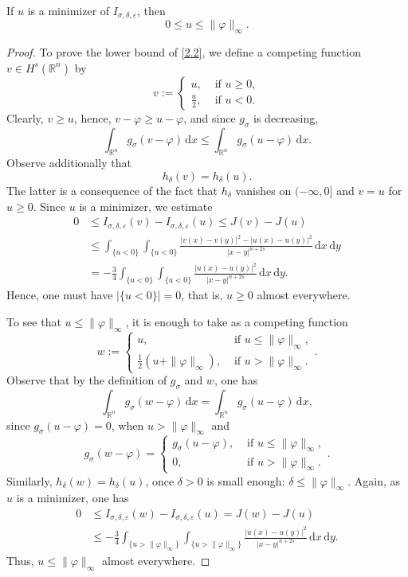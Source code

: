 \documentclass[10pt,a4paper]{amsart}
\newcommand{\R}{\mathbb{R}}
\begin{document}
\begin{proposition}\label{p2.1}
If $u$ is a minimizer of $I_{\sigma,\delta,\varepsilon}$, then 
\begin{equation}\label{2.2}
0\le u \le \| \varphi\|_\infty.
\end{equation}
\end{proposition} 

\begin{proof}	
	To prove the lower bound of \eqref{2.2}, we define a competing function $v\in H^s(\R^n)$ by
	\begin{equation*}
	v:= \begin{cases}
	u, & \text{ if }u\ge0,\\
	\frac{u}{2}, & \text{ if } u<0.
	\end{cases}
	\end{equation*}
	Clearly, $v\ge u$, hence, $v-\varphi\ge u-\varphi$, and since $g_{\sigma}$ is decreasing,
	$$
	\int_{\R^n} g_\sigma(v-\varphi)\,\mathrm{d}x\le\int_{\R^n}  g_\sigma(u-\varphi)\,\mathrm{d}x.
	$$
	Observe additionally that  
	$$
	h_\delta(v)=h_\delta(u).
	$$ 
	The latter is a consequence of the fact that $h_\delta$ vanishes on $(-\infty,0]$ and $v=u$ for $u\ge0$. Since $u$ is a minimizer, we estimate
	\begin{align*}
	0 &\le I_{\sigma,\delta,\varepsilon}(v)-I_{\sigma,\delta,\varepsilon}(u)\leq J(v)-J(u)\\
	&\le\int_{\{u<0\}}\int_{\{u<0\}}\frac{|v(x)-v(y)|^2-|u(x)-u(y)|^2}{|x-y|^{n+2s}}\,\mathrm{d}x\,\mathrm{d}y\\
	&=-\frac{3}{4}\int_{\{u<0\}}\int_{\{u<0\}}\frac{|u(x)-u(y)|^2}{|x-y|^{n+2s}}\,\mathrm{d}x\,\mathrm{d}y.
	\end{align*}
	Hence, one must have $|\{u<0\}|=0$, that is, $u\ge0$ almost everywhere.	
	
	To see that $u\le\|\varphi\|_\infty$, it is enough to take as a competing function 
	\[
	w:=\begin{cases}
	u, &  \text{ if } u\le\|\varphi\|_\infty,\\ 
	\frac12\left(u+\|\varphi\|_\infty\right), & \text{ if }u>\|\varphi\|_\infty.
	\end{cases}.
	\] 
	Observe that by the definition of $g_\sigma$ and $w$, one has
	$$
	\int_{\R^n} g_\sigma(w-\varphi)\,\mathrm{d}x=\int_{\R^n} g_\sigma(u-\varphi)\,\mathrm{d}x,
	$$
	since $g_\sigma(u-\varphi)=0$, when $u>\|\varphi\|_\infty$ and
	\[
	g_\sigma(w-\varphi)=\begin{cases}
		g_\sigma(u-\varphi), & \text{ if } u\le\|\varphi\|_\infty,\\ 
		0, & \text{ if }u>\|\varphi\|_\infty.
	\end{cases}.
	\] 
	Similarly, $h_\delta(w)=h_\delta(u)$, once $\delta>0$ is small enough: $\delta\le\|\varphi\|_\infty$. Again, as $u$ is a minimizer, one has
    \begin{align*}
	0&\le I_{\sigma,\delta,\varepsilon}(w)-I_{\sigma,\delta,\varepsilon}(u)= J(w)-J(u)\\
	&\le-\frac34\int_{\{u>\|\varphi\|_\infty\}}\int_{\{u>\|\varphi\|_\infty\}}\frac{|u(x)-u(y)|^2}{|x-y|^{n+2s}}\,\mathrm{d}x\,\mathrm{d}y.
	\end{align*}
	Thus, $u\le\|\varphi\|_\infty$ almost everywhere.
\end{proof}
\end{document}
